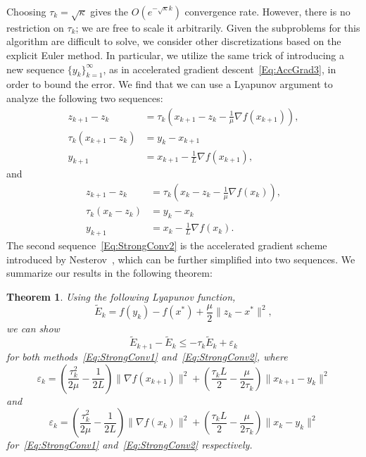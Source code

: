\documentclass[11pt]{article}
\theoremstyle{plain}
\newtheorem{theorem}{Theorem}
\begin{document}
\noindent Choosing $\tau_k = \sqrt{\kappa}$ gives the $O(e^{-\sqrt{\kappa} k})$ convergence rate. However, there is no restriction on $\tau_k$;  we are free to scale it arbitrarily. Given the subproblems for this algorithm are difficult to solve, we consider other discretizations based on the explicit Euler method. In particular, we utilize the same trick of introducing a new sequence $\{y_k\}_{k=1}^\infty$, as in accelerated gradient descent~\eqref{Eq:AccGrad3},  in order to bound the error. We find that we can use a Lyapunov argument to analyze the following two sequences: 
\begin{subequations}\label{Eq:StrongConv1}
\begin{align} 
z_{k+1} - z_k &= \tau_k \left( x_{k+1} - z_k - \frac{1}{\mu} \nabla f(x_{k+1})\right), \label{Eq:ZSeq2}\\
\tau_k(x_{k+1} - z_k) &= y_k - x_{k+1} \label{Eq:Coupling2}\\
y_{k+1} &= x_{k+1} - \frac{1}{L} \nabla f(x_{k+1}),\label{Eq:Grad2}
\end{align}
\end{subequations}
and 
\begin{subequations}\label{Eq:StrongConv2}
\begin{align}
z_{k+1} - z_k &= \tau_k \left( x_k - z_k - \frac{1}{\mu} \nabla f(x_k)\right), \label{Eq:ZSeq1}\\
\tau_k(x_k - z_k) &= y_k - x_k\label{Eq:Coupling1}\\
y_{k+1} &= x_k - \frac{1}{L} \nabla f(x_k). \label{Eq:Grad1}
\end{align}
\end{subequations}
The second sequence~\eqref{Eq:StrongConv2} is the accelerated gradient scheme introduced by Nesterov~\cite[(2.2.8)]{Nesterov04}, which can be further simplified into two sequences. We summarize our results in the following theorem:
\begin{theorem}Using the following Lyapunov function, 
\begin{equation}\label{Eq:LyapStrong}
\tilde E_k = f(y_k) - f(x^\ast) + \frac{\mu}{2}\|z_k - x^\ast\|^2,
\end{equation}
we can show 
\begin{equation}
\tilde E_{k+1} -\tilde  E_k \leq -\tau_k \tilde E_k + \varepsilon_k
\end{equation}
for both methods~\eqref{Eq:StrongConv1} and~\eqref{Eq:StrongConv2}, where
\begin{equation}
\varepsilon_k = \left(\frac{\tau_k^2}{2\mu} - \frac{1}{2L}\right)\|\nabla f(x_{k+1})\|^2 + \left(\frac{\tau_kL}{2}-\frac{\mu}{2\tau_k}\right)\|x_{k+1} - y_k\|^2
\end{equation}
 and 
\begin{equation}
\varepsilon_k = \left(\frac{\tau_k^2}{2\mu} - \frac{1}{2L}\right)\|\nabla f(x_k)\|^2 + \left(\frac{\tau_kL}{2}-\frac{\mu}{2\tau_k}\right)\|x_k - y_k\|^2
\end{equation}
for~\eqref{Eq:StrongConv1} and~\eqref{Eq:StrongConv2} respectively.
\end{theorem}
\end{document}
